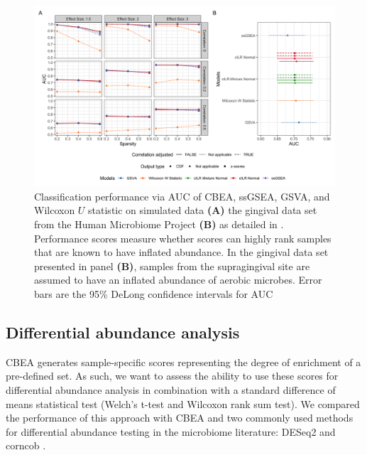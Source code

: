 \documentclass[10pt,letterpaper]{article}
\begin{document}
\begin{figure}[!h]
    \centering
    \includegraphics[width = \textwidth]{figures/sim_data_ss_auc.png}
    \caption{Classification performance via AUC of CBEA, ssGSEA, GSVA, and Wilcoxon $U$ statistic on simulated data \textbf{(A)} the gingival data set from the Human Microbiome Project  \textbf{(B)} as detailed in . Performance scores measure whether scores can highly rank samples that are known to have inflated abundance. In the gingival data set presented in panel \textbf{(B)}, samples from the supragingival site are assumed to have an inflated abundance of aerobic microbes. Error bars are the 95\% DeLong confidence intervals for AUC \cite{delong1988}} 
    \label{fig:3}
\end{figure}

\subsection*{Differential abundance analysis}
CBEA generates sample-specific scores representing the degree of enrichment of a pre-defined set. As such, we want to assess the ability to use these scores for differential abundance analysis in combination with a standard difference of means statistical test (Welch's t-test and Wilcoxon rank sum test). We compared the performance of this approach with CBEA and two commonly used methods for differential abundance testing in the microbiome literature: DESeq2 \cite{love2014} and corncob \cite{martin2020}.   
\end{document}
